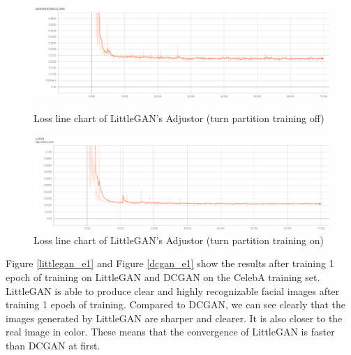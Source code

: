     \begin{figure}
        \begin{minipage}[t]{0.49\linewidth}
            \centering
            \includegraphics[width=\textwidth]{figures/loss_part_off_u.png}
            \caption{Loss line chart of LittleGAN's Adjustor (turn partition training off)}
            \label{loss_part_off_u}
        \end{minipage}
            \hfill
        \begin{minipage}[t]{0.49\linewidth}
            \centering
            \includegraphics[width=\textwidth]{figures/loss_part_on_u.png}
            \caption{Loss line chart of LittleGAN's Adjustor (turn partition training on)}
            \label{loss_part_on_u}
        \end{minipage}
    \end{figure}

Figure \ref{littlegan_e1} and Figure \ref{dcgan_e1} show the results after training 1 epoch of training on LittleGAN and DCGAN on the CelebA training set.
LittleGAN is able to produce clear and highly recognizable facial images after training 1 epoch of training.
Compared to DCGAN, we can see clearly that the images generated by LittleGAN are sharper and clearer.
It is also closer to the real image in color.
These means that the convergence of LittleGAN is faster than DCGAN at first.

